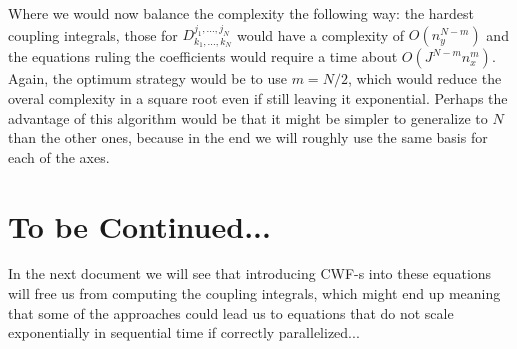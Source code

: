 \documentclass[11pt, a4paper]{article} %
\begin{document}
Where we would now balance the complexity the following way: the hardest coupling integrals, those for $D^{j_1,...,j_N}_{k_1,...,k_N}$ would have a complexity of $O(n_y^{N-m})$ and the equations ruling the coefficients would require a time about $O(J^{N-m}n_x^m)$. Again, the optimum strategy would be to use $m=N/2$, which would reduce the overal complexity in a square root even if still leaving it exponential. Perhaps the advantage of this algorithm would be that it might be simpler to generalize to $N$ than the other ones, because in the end we will roughly use the same basis for each of the axes.



\section*{To be Continued...}
In the next document we will see that introducing CWF-s into these equations will free us from computing the coupling integrals, which might end up meaning that some of the approaches could lead us to equations that do not scale exponentially in sequential time if correctly parallelized...
















 


\end{document}
